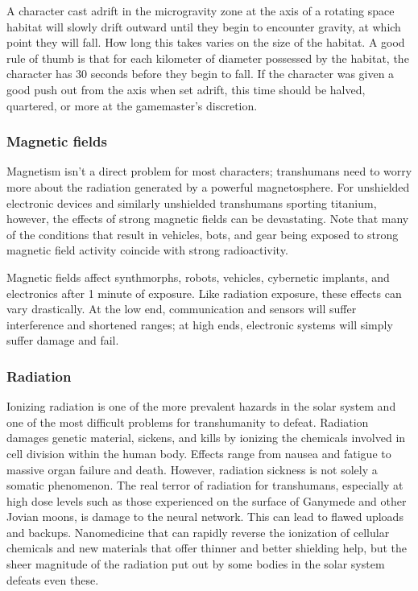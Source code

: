 A character cast adrift in the microgravity zone at the axis of a rotating space habitat will slowly drift outward until they begin to encounter gravity, at which point they will fall. How long this takes varies on the size of the habitat. A good rule of thumb is that for each kilometer of diameter possessed by the habitat, the character has 30 seconds before they begin to fall. If the character was given a good push out from the axis when set adrift, this time should be halved, quartered, or more at the gamemaster’s discretion. 

\subsubsection{Magnetic fields} 

Magnetism isn’t a direct problem for most characters; transhumans need to worry more about the radiation generated by a powerful magnetosphere. For unshielded electronic devices and similarly unshielded transhumans sporting titanium, however, the effects of strong magnetic fields can be devastating. Note that many of the conditions that result in vehicles, bots, and gear being exposed to strong magnetic field activity coincide with strong radioactivity. 

Magnetic fields affect synthmorphs, robots, vehicles, cybernetic implants, and electronics after 1 minute of exposure. Like radiation exposure, these effects can vary drastically. At the low end, communication and sensors will suffer interference and shortened ranges; at high ends, electronic systems will simply suffer damage and fail. 

\subsubsection{Radiation} 

Ionizing radiation is one of the more prevalent hazards in the solar system and one of the most difficult problems for transhumanity to defeat. Radiation damages genetic material, sickens, and kills by ionizing the chemicals involved in cell division within the human body. Effects range from nausea and fatigue to massive organ failure and death. However, radiation sickness is not solely a somatic phenomenon. The real terror of radiation for transhumans, especially at high dose levels such as those experienced on the surface of Ganymede and other Jovian moons, is damage to the neural network. This can lead to flawed uploads and backups. Nanomedicine that can rapidly reverse the ionization of cellular chemicals and new materials that offer thinner and better shielding help, but the sheer magnitude of the radiation put out by some bodies in the solar system defeats even these. 

